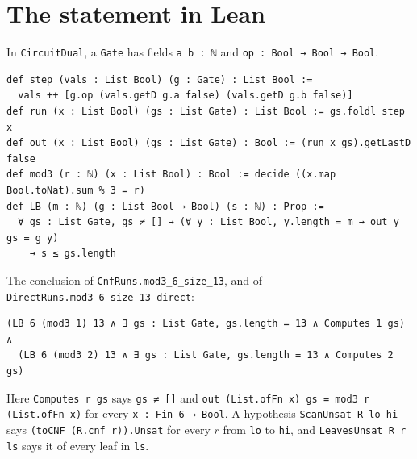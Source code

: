 \documentclass[11pt]{article}
\newcommand{\lean}[1]{\texttt{#1}}
\begin{document}
\section{The statement in Lean}\label{app:lean}

In \lean{CircuitDual}, a \lean{Gate} has fields \lean{a b : ℕ} and \lean{op : Bool → Bool → Bool}.
\par{\small
\begin{verbatim}
def step (vals : List Bool) (g : Gate) : List Bool :=
  vals ++ [g.op (vals.getD g.a false) (vals.getD g.b false)]
def run (x : List Bool) (gs : List Gate) : List Bool := gs.foldl step x
def out (x : List Bool) (gs : List Gate) : Bool := (run x gs).getLastD false
def mod3 (r : ℕ) (x : List Bool) : Bool := decide ((x.map Bool.toNat).sum % 3 = r)
def LB (m : ℕ) (g : List Bool → Bool) (s : ℕ) : Prop :=
  ∀ gs : List Gate, gs ≠ [] → (∀ y : List Bool, y.length = m → out y gs = g y)
    → s ≤ gs.length
\end{verbatim}}
The conclusion of \lean{CnfRuns.mod3\_6\_size\_13}, and of \lean{DirectRuns.mod3\_6\_size\_13\_direct}:
\par{\small
\begin{verbatim}
(LB 6 (mod3 1) 13 ∧ ∃ gs : List Gate, gs.length = 13 ∧ Computes 1 gs) ∧
  (LB 6 (mod3 2) 13 ∧ ∃ gs : List Gate, gs.length = 13 ∧ Computes 2 gs)
\end{verbatim}}
Here \lean{Computes r gs} says \lean{gs ≠ []} and \lean{out (List.ofFn x) gs = mod3 r (List.ofFn x)} for every
\lean{x : Fin 6 → Bool}. A hypothesis \lean{ScanUnsat R lo hi} says \lean{(toCNF (R.cnf r)).Unsat} for every $r$
from \lean{lo} to \lean{hi}, and \lean{LeavesUnsat R r ls} says it of every leaf in \lean{ls}.
\end{document}
